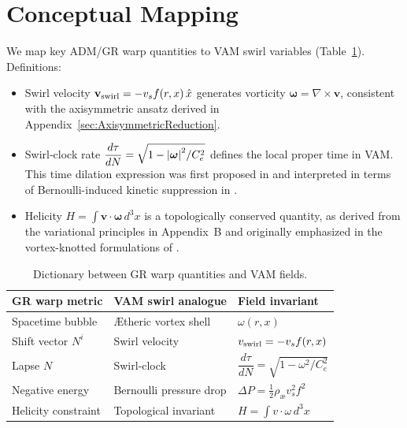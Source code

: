 \documentclass[preprint,notitlepage]{revtex4-2}
\begin{document}
\section{Conceptual Mapping}
We map key ADM/GR warp quantities to VAM swirl variables (Table~\ref{tab:mapping}). Definitions:
\begin{itemize}
  \item Swirl velocity $\mathbf{v}_{\rm swirl} = -v_s f(r,x)\,\hat x$ generates vorticity $\boldsymbol{\omega} = \nabla \times \mathbf{v}$, consistent with the axisymmetric ansatz derived in Appendix~\ref{sec:AxisymmetricReduction}.
  \item Swirl‐clock rate $\dfrac{d\tau}{dN} = \sqrt{1 - \abs{\boldsymbol{\omega}}^2 / C_e^2}$ defines the local proper time in VAM. This time dilation expression was first proposed in \cite{VAM1} and interpreted in terms of Bernoulli-induced kinetic suppression in \cite{VAM2}.
  \item Helicity $H = \int \mathbf{v} \cdot \boldsymbol{\omega}\, d^3x$ is a topologically conserved quantity, as derived from the variational principles in Appendix~B and originally emphasized in the vortex-knotted formulations of \cite{VAM2, VAM4}.
\end{itemize}

\begin{table}[H]
    \centering
    \renewcommand{\arraystretch}{1.3}
    \begin{tabular}{|l|l|l|}
        \hline
        GR warp metric & VAM swirl analogue & Field invariant \\
        \hline
        Spacetime bubble & Ætheric vortex shell & $\omega(r,x)$ \\
        Shift vector $N^i$ & Swirl velocity & $v_{\rm swirl} = -v_s f(r,x)$ \\
        Lapse $N$ & Swirl‐clock & $\dfrac{d\tau}{dN} = \sqrt{1 - \omega^2 / C_e^2}$ \\
        Negative energy & Bernoulli pressure drop & $\Delta P = \tfrac{1}{2} \rho_{\text{\ae}} v_s^2 f^2$ \\
        Helicity constraint & Topological invariant & $H = \int v \cdot \omega\, d^3x$ \\
        \hline
    \end{tabular}
    \caption{Dictionary between GR warp quantities and VAM fields.}
    \label{tab:mapping}
\end{table}
\end{document}
